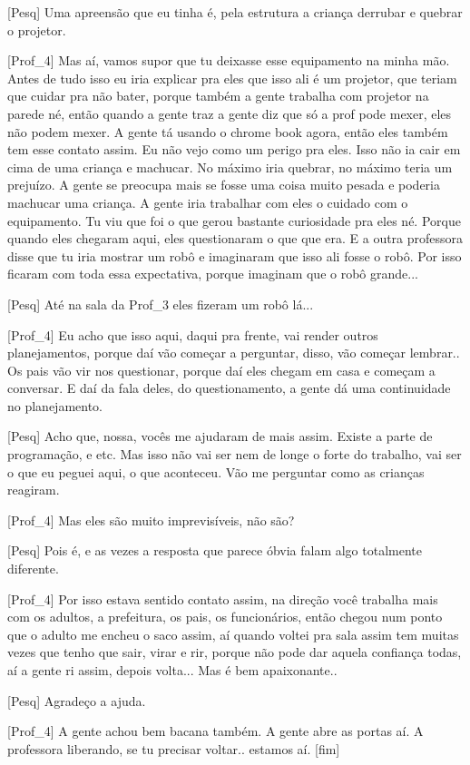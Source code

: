 [Pesq] Uma apreensão que eu tinha é, pela estrutura a criança derrubar e quebrar o projetor.

[Prof\_4] Mas aí, vamos supor que tu deixasse esse equipamento na minha mão. Antes de tudo isso eu iria explicar pra eles que isso ali é um projetor, que teriam que cuidar pra não bater, porque também a gente trabalha com projetor na parede né, então quando a gente traz a gente diz que só a prof pode mexer, eles não podem mexer. A gente tá usando o chrome book agora, então eles também tem esse contato assim. Eu não vejo como um perigo pra eles. Isso não ia cair em cima de uma criança e machucar. No máximo iria quebrar, no máximo teria um prejuízo. A gente se preocupa mais se fosse uma coisa muito pesada e poderia machucar uma criança. A gente iria trabalhar com eles o cuidado com o equipamento. Tu viu que foi o que gerou bastante curiosidade pra eles né. Porque quando eles chegaram aqui, eles questionaram o que que era. E a outra professora disse que tu iria mostrar um robô e imaginaram que isso ali fosse o robô. Por isso ficaram com toda essa expectativa, porque imaginam que o robô grande... 

[Pesq] Até na sala da Prof\_3 eles fizeram um robô lá... 

[Prof\_4] Eu acho que isso aqui, daqui pra frente, vai render outros planejamentos, porque daí vão começar a perguntar, disso, vão começar lembrar.. Os pais vão vir nos questionar, porque daí eles chegam em casa e começam a conversar. E daí da fala deles, do questionamento, a gente dá uma continuidade no planejamento. 

[Pesq] Acho que, nossa, vocês me ajudaram de mais assim. Existe a parte de programação, e etc. Mas isso não vai ser nem de longe o forte do trabalho, vai ser o que eu peguei aqui, o que aconteceu. Vão me perguntar como as crianças reagiram.

[Prof\_4] Mas eles são muito imprevisíveis, não são?

[Pesq] Pois é, e as vezes a resposta que parece óbvia falam algo totalmente diferente.

[Prof\_4] Por isso estava sentido contato assim, na direção você trabalha mais com os adultos, a prefeitura, os pais, os funcionários, então chegou num ponto que o adulto me encheu o saco assim, aí quando voltei pra sala assim tem muitas vezes que tenho que sair, virar e rir, porque não pode dar aquela confiança todas, aí a gente ri assim, depois volta... Mas é bem apaixonante..

[Pesq] Agradeço a ajuda.

[Prof\_4] A gente achou bem bacana também. A gente abre as portas aí. A professora liberando, se tu precisar voltar.. estamos aí.
[fim]